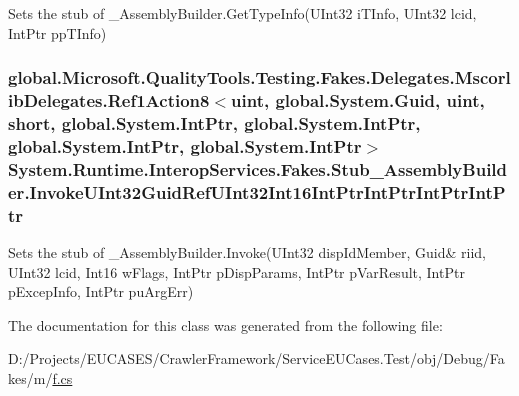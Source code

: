 Sets the stub of \-\_\-\-Assembly\-Builder.\-Get\-Type\-Info(\-U\-Int32 i\-T\-Info, U\-Int32 lcid, Int\-Ptr pp\-T\-Info)

\hypertarget{class_system_1_1_runtime_1_1_interop_services_1_1_fakes_1_1_stub___assembly_builder_a57f8f1e91be52b5868e171e5d3fc2849}{
\subsubsection[{Invoke\-U\-Int32\-Guid\-Ref\-U\-Int32\-Int16\-Int\-Ptr\-Int\-Ptr\-Int\-Ptr\-Int\-Ptr}]{\setlength{\rightskip}{0pt plus 5cm}global.\-Microsoft.\-Quality\-Tools.\-Testing.\-Fakes.\-Delegates.\-Mscorlib\-Delegates.\-Ref1\-Action8$<$uint, global.\-System.\-Guid, uint, short, global.\-System.\-Int\-Ptr, global.\-System.\-Int\-Ptr, global.\-System.\-Int\-Ptr, global.\-System.\-Int\-Ptr$>$ System.\-Runtime.\-Interop\-Services.\-Fakes.\-Stub\-\_\-\-Assembly\-Builder.\-Invoke\-U\-Int32\-Guid\-Ref\-U\-Int32\-Int16\-Int\-Ptr\-Int\-Ptr\-Int\-Ptr\-Int\-Ptr}}\label{class_system_1_1_runtime_1_1_interop_services_1_1_fakes_1_1_stub___assembly_builder_a57f8f1e91be52b5868e171e5d3fc2849}


Sets the stub of \-\_\-\-Assembly\-Builder.\-Invoke(U\-Int32 disp\-Id\-Member, Guid\& riid, U\-Int32 lcid, Int16 w\-Flags, Int\-Ptr p\-Disp\-Params, Int\-Ptr p\-Var\-Result, Int\-Ptr p\-Excep\-Info, Int\-Ptr pu\-Arg\-Err)



The documentation for this class was generated from the following file\-:\begin{DoxyCompactItemize}
\item 
D\-:/\-Projects/\-E\-U\-C\-A\-S\-E\-S/\-Crawler\-Framework/\-Service\-E\-U\-Cases.\-Test/obj/\-Debug/\-Fakes/m/\hyperlink{m_2f_8cs}{f.\-cs}\end{DoxyCompactItemize}

